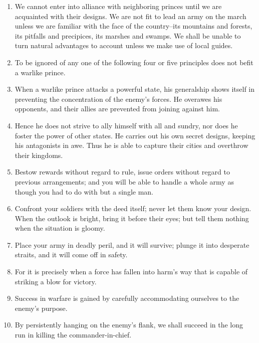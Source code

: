 \begin{enumerate}
  \item We cannot enter into alliance with neighboring princes until
    we are acquainted with their designs. We are not fit to lead an
    army on the march unless we are familiar with the face of the
    country--its mountains and forests, its pitfalls and precipices,
    its marshes and swamps. We shall be unable to turn natural
    advantages to account unless we make use of local guides.

  \item To be ignored of any one of the following four or five
    principles does not befit a warlike prince.

  \item When a warlike prince attacks a powerful state, his
    generalship shows itself in preventing the concentration of the
    enemy's forces. He overawes his opponents, and their allies are
    prevented from joining against him.

  \item Hence he does not strive to ally himself with all and sundry,
    nor does he foster the power of other states. He carries out his
    own secret designs, keeping his antagonists in awe. Thus he is
    able to capture their cities and overthrow their kingdoms.

  \item Bestow rewards without regard to rule, issue orders without
    regard to previous arrangements; and you will be able to handle a
    whole army as though you had to do with but a single man.

  \item Confront your soldiers with the deed itself; never let them
    know your design. When the outlook is bright, bring it before
    their eyes; but tell them nothing when the situation is gloomy.

  \item Place your army in deadly peril, and it will survive; plunge
    it into desperate straits, and it will come off in safety.

  \item For it is precisely when a force has fallen into harm's way
    that is capable of striking a blow for victory.

  \item Success in warfare is gained by carefully accommodating
    ourselves to the enemy's purpose.

  \item By persistently hanging on the enemy's flank, we shall succeed
    in the long run in killing the commander-in-chief.


\end{enumerate}

